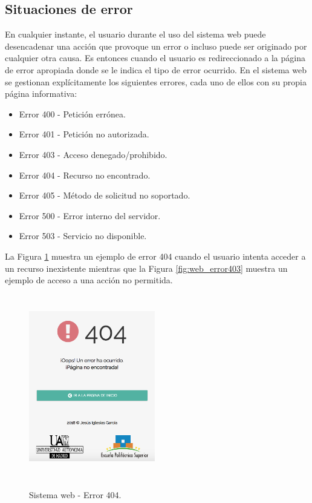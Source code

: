 \documentclass[12pt,a4paper, twoside]{report}
\begin{document}
	\subsection{Situaciones de error}
	
	En cualquier instante, el usuario durante el uso del sistema web puede desencadenar una acción que provoque un error o incluso puede ser originado por cualquier otra causa. Es entonces cuando el usuario es redireccionado a la página de error apropiada donde se le indica el tipo de error ocurrido. En el sistema web se gestionan explícitamente los siguientes errores, cada uno de ellos con su propia página informativa:
	
	 \begin{itemize}
	 	\item Error 400 - Petición errónea.
	 	\item Error 401 - Petición no autorizada.
	 	\item Error 403 - Acceso denegado/prohibido.
	 	\item Error 404 - Recurso no encontrado.
	 	\item Error 405 - Método de solicitud no soportado.
	 	\item Error 500 - Error interno del servidor.
	 	\item Error 503 - Servicio no disponible.
	 \end{itemize}
	
	La Figura \ref{fig:web_error404} muestra un ejemplo de error 404 cuando el usuario intenta acceder a un recurso inexistente mientras que la Figura \ref{fig:web_error403} muestra un ejemplo de acceso a una acción no permitida.
	
		\begin{figure}[!ht]   
			\caption{Sistema web - Error 404.} 
			\begin{center} 
	 			\includegraphics[width=5.5cm, height=8cm]{Images/userGuide/web/error404} \\
				\label{fig:web_error404} 
			\end{center}  	
		\end{figure}
	
\end{document}
